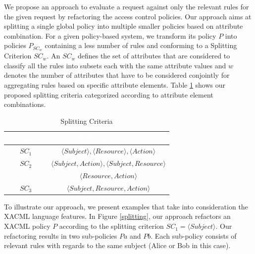 We propose an approach to evaluate a request against only the relevant rules for the given request by refactoring the access control policies. Our approach aims at splitting a single global policy into 
multiple smaller policies based on attribute combination. For a given policy-based system, we transform its policy \normalsize $P$ into 
policies \normalsize $P_{SC_{w}}$ containing a less number of rules and conforming to a Splitting Criterion $SC_{w}$. 
An $SC_{w}$ defines the set of attributes that are considered to classify all the rules into subsets each with the same attribute values and $w$ denotes 
the number of attributes that have to be considered conjointly for aggregating rules based on specific attribute elements. 
Table \ref{table1} 
shows our proposed splitting criteria categorized according to attribute element combinations.
\begin{table}[h!]
\centering
\setlength{\extrarowheight}{6 pt}
\begin{tabular}{|>{\small}c|>{\small}c|}
\hline \rowcolor{black}
\bf
\textcolor{white}{Categories}& \bf \textcolor{white}{Splitting Criteria}\\ \hline
$SC_{1}$& {$\langle Subject \rangle, \langle Resource\rangle, \langle Action\rangle$}\\ \hline
$SC_{2}$& {$\langle Subject,Action \rangle, \langle Subject,Resource\rangle$}\\&{$\langle Resource,Action\rangle$}\\ \hline
$SC_{3}$& {$\langle Subject,Resource,Action\rangle$}\\ \hline
\end{tabular}
\caption{Splitting Criteria}
\label{table1}\end{table}

To illustrate our approach, we present examples that take into consideration the XACML language features.
In Figure \ref{splitting}, our approach refactors an XACML policy $P$  according to the splitting criterion $SC_{1}=\langle Subject\rangle$. Our refactoring results 
in two sub-policies $Pa$ and $Pb$. Each sub-policy consists of relevant rules with regards to the same subject (Alice or Bob in this case). 

